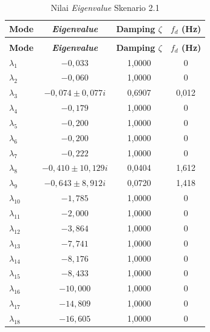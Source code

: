 \begingroup
\fontsize{11}{13.2}\selectfont
\setlength{\tabcolsep}{7pt}
\begin{longtable}{>{\centering\arraybackslash}m{1.5cm} c c c} \caption[]{Nilai
	\textit{Eigenvalue} Skenario 2.1} \label{tab:eigenvalue_sk21_lampiran} \\
	\toprule
	\textbf{Mode} & \textbf{\textit{Eigenvalue}} & \textbf{Damping $\zeta$} &
	\textbf{$f_d$ (Hz)} \\
	\midrule
	\endfirsthead
	\multicolumn{4}{l}{\textit{(lanjutan)}} \\
	\toprule
	\textbf{Mode} & \textbf{\textit{Eigenvalue}} & \textbf{Damping $\zeta$} &
	\textbf{$f_d$ (Hz)} \\
	\midrule
	\endhead
	\bottomrule
	\endfoot
	$\lambda_1$  & $-0{,}033$                    & 1,0000 & 0 \\
	$\lambda_2$  & $-0{,}060$                    & 1,0000 & 0 \\
	$\lambda_3$  & $-0{,}074 \pm 0{,}077i$       & 0,6907 & 0,012 \\
	$\lambda_4$  & $-0{,}179$                    & 1,0000 & 0 \\
	$\lambda_5$  & $-0{,}200$                    & 1,0000 & 0 \\
	$\lambda_6$  & $-0{,}200$                    & 1,0000 & 0 \\
	$\lambda_7$  & $-0{,}222$                    & 1,0000 & 0 \\
	$\lambda_8$  & $-0{,}410 \pm 10{,}129i$      & 0,0404 & 1,612 \\
	$\lambda_9$  & $-0{,}643 \pm 8{,}912i$       & 0,0720 & 1,418 \\
	$\lambda_{10}$ & $-1{,}785$                  & 1,0000 & 0 \\
	$\lambda_{11}$ & $-2{,}000$                  & 1,0000 & 0 \\
	$\lambda_{12}$ & $-3{,}864$                  & 1,0000 & 0 \\
	$\lambda_{13}$ & $-7{,}741$                  & 1,0000 & 0 \\
	$\lambda_{14}$ & $-8{,}176$                  & 1,0000 & 0 \\
	$\lambda_{15}$ & $-8{,}433$                  & 1,0000 & 0 \\
	$\lambda_{16}$ & $-10{,}000$                 & 1,0000 & 0 \\
	$\lambda_{17}$ & $-14{,}809$                 & 1,0000 & 0 \\
	$\lambda_{18}$ & $-16{,}605$                 & 1,0000 & 0 \\

\end{longtable}
